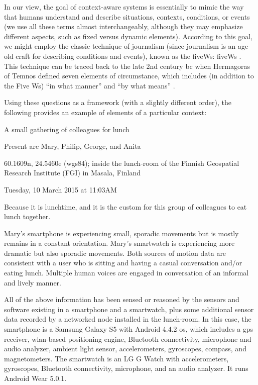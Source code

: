 In our view, the goal of context-aware systems is essentially to mimic the way that humans understand and describe situations, contexts, conditions, or events (we use all these terms almost interchangeably, although they may emphasize different aspects, such as fixed versus dynamic elements). According to this goal, we might employ the classic technique of journalism (since journalism is an age-old craft for describing conditions and events), known as the \acrshort{fiveWs}: \acrlong{fiveWs} . This technique can be traced back to the late 2nd century \acrshort{bc} when Hermagoras of Temnos defined seven elements of circumstance, which includes (in addition to the Five Ws) ``in what manner'' and ``by what means'' \cite{bennett2005hermagoras}.

Using these questions as a framework (with a slightly different order), the following provides an example of elements of a particular context:
%
\begin{bold_description}
\item[What:]A small gathering of colleagues for lunch
\item[Who:] Present are Mary, Philip, George, and Anita
\item[Where:]60.1609\textdegree{}\acrshort{n}, 24.5460\textdegree{}\acrshort{e} (\acrshort{wgs84}); inside the lunch-room of the Finnish Geospatial Research Institute (FGI) in Masala, Finland
\item[When:]Tuesday, 10 March 2015 at 11:03AM
\item[Why:]Because it is lunchtime, and it is the custom for this group of colleagues to eat lunch together.
\item[In What Manner:] Mary's smartphone is experiencing small, sporadic movements but is mostly remains in a constant orientation. Mary's smartwatch is experiencing more dramatic but also sporadic movements. Both sources of motion data are consistent with a user who is sitting and having a casual conversation and/or eating lunch. Multiple human voices are engaged in conversation of an informal and lively manner.
\item[By What Means:]All of the above information has been sensed or reasoned by the sensors and software existing in a smartphone and a smartwatch, plus some additional sensor data recorded by a networked node installed in the lunch-room. In this case, the smartphone is a Samsung Galaxy S5 with Android 4.4.2 \gls{os}, which includes a \gls{gps} receiver, \acrshort{wlan}-based positioning engine, Bluetooth connectivity, microphone and audio analyzer, ambient light sensor, accelerometers, gyroscopes, compass, and magnetometers. The smartwatch is an LG G Watch with accelerometers, gyroscopes, Bluetooth connectivity, microphone, and an audio analyzer. It runs Android Wear 5.0.1.
\end{bold_description}

